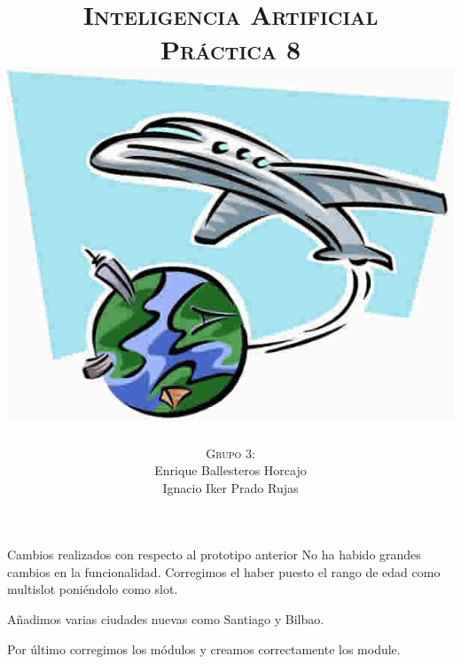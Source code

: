 \documentclass[11pt, a4paper, spanish, openright, twoside]{book}
\begin{document}
 
\title{\Huge{\textsc{Inteligencia Artificial}} \\
	\vspace{0.7cm}
	 \textsc{\Large{Práctica 8}} \\
	\vspace{1.5cm}
	\includegraphics[scale=0.45]{viaje}
	}
\author{\textsc{Grupo 3:}\\
	Enrique Ballesteros Horcajo\\
	Ignacio Iker Prado Rujas}
\date{\Today}
\maketitle

\newpage
\mbox{}
\thispagestyle{empty}						%
\newpage


\tableofcontents 							%

\newpage
\mbox{}
\thispagestyle{empty}						%
\newpage


\vspace{3cm}


\newpage

\begin{section}{Cambios realizados con respecto al prototipo anterior}
		No ha habido grandes cambios en la funcionalidad. Corregimos el haber puesto el rango de edad como
		 multislot poniéndolo como slot.
		 
		 Añadimos varias ciudades nuevas como Santiago y Bilbao.
		 
		 Por último corregimos los módulos y creamos correctamente los module.
	
	
\end{section}
\end{document}

